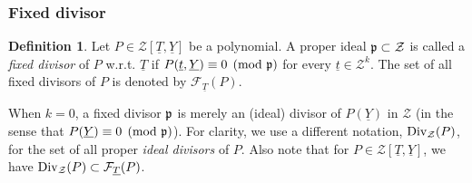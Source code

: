 \documentclass[11pt,a4paper,reqno]{amsart}
\theoremstyle{definition}
\newtheorem{defn}[thm]{Definition}
\newtheorem{rmk}[thm]{Remark}
\begin{document}




\subsubsection{Fixed divisor}


\begin{defn}
Let $P \in {\mathcal Z}[\underline{T},\underline{Y}]$ be a polynomial. A proper ideal ${\frak p}\subset {\mathcal Z}$ is called a \emph{fixed divisor} of $P$ \hbox{w.r.t.} $\underline{T}$ if
$P(\underline{t},\underline{Y}) \equiv 0 \pmod{{\frak p}}$
for every $\underline{t} \in {\mathcal Z}^k$.
The set of all fixed divisors of $P$ is denoted by $\mathcal{F}_{\underline{T}}(P)$. 
\end{defn}

When $k=0$, a fixed divisor ${\frak p}$ is merely an (ideal) divisor of $P(\underline{Y})$ in ${\mathcal Z}$ (in the sense that $P(\underline{Y}) \equiv 0 \pmod{{\frak p}}$). For clarity, we use a different notation, ${\rm Div}_{\mathcal{Z}}(P)$, for the set of all {proper} \emph{ideal divisors} of $P$. Also note that for $P\in {\mathcal Z}[\underline T,\underline Y]$, we have
${\rm Div}_{\mathcal{Z}}(P) \subset \mathcal{F}_{\underline{T}}(P)$.
\end{document}
